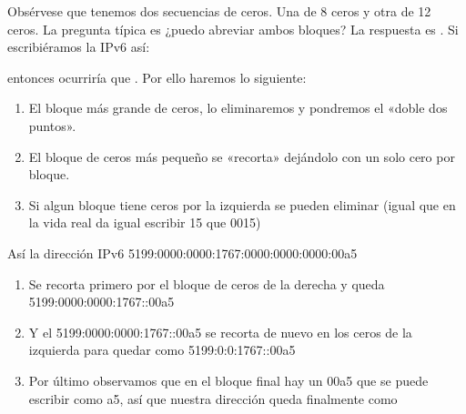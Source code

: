\documentclass[letterpaper,10pt,spanish]{sphinxmanual}
\begin{document}
\begin{sphinxVerbatim}[commandchars=\\\{\}]
\end{sphinxVerbatim}

\sphinxAtStartPar
Obsérvese que tenemos dos secuencias de ceros. Una de 8 ceros y otra de 12 ceros. La pregunta típica es ¿puedo abreviar ambos bloques? La respuesta es . Si escribiéramos la IPv6 así:

\begin{sphinxVerbatim}[commandchars=\\\{\}]
\end{sphinxVerbatim}

\sphinxAtStartPar
entonces ocurriría que . Por ello haremos lo siguiente:
\begin{enumerate}
%
\item {} 
\sphinxAtStartPar
El bloque más grande de ceros, lo eliminaremos y pondremos el «doble dos puntos».

\item {} 
\sphinxAtStartPar
El bloque de ceros más pequeño se «recorta» dejándolo con un solo cero por bloque.

\item {} 
\sphinxAtStartPar
Si algun bloque tiene ceros por la izquierda se pueden eliminar (igual que en la vida real da igual escribir 15 que 0015)

\end{enumerate}

\sphinxAtStartPar
Así la dirección IPv6 5199:0000:0000:1767:0000:0000:0000:00a5
\begin{enumerate}
%
\item {} 
\sphinxAtStartPar
Se recorta primero por el bloque de ceros de la derecha y queda 5199:0000:0000:1767::00a5

\item {} 
\sphinxAtStartPar
Y el 5199:0000:0000:1767::00a5 se recorta de nuevo en los ceros de la izquierda para quedar como 5199:0:0:1767::00a5

\item {} 
\sphinxAtStartPar
Por último observamos que en el bloque final hay un 00a5 que se puede escribir como a5, así que nuestra dirección queda finalmente como 

\end{enumerate}
\end{document}
